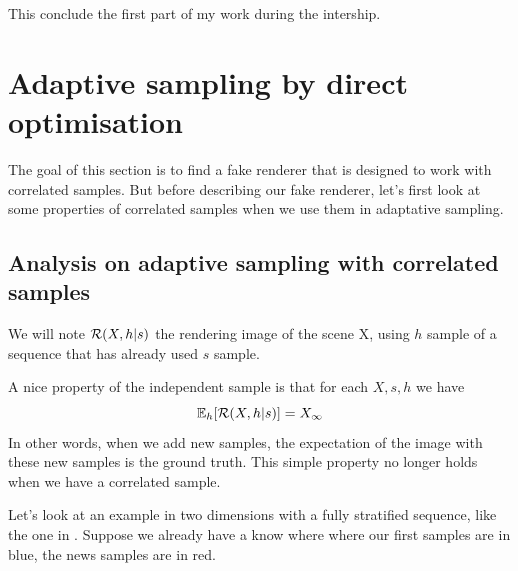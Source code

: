 \documentclass{classeENS}
\begin{document}
\par This conclude the first part of my work during the intership.


\section{Adaptive sampling by direct optimisation}

The goal of this section is to find a fake renderer that is designed to work
with correlated samples. But before describing our fake renderer, let's first look at
some properties of correlated samples when we use them in adaptative sampling.

\subsection{Analysis on adaptive sampling with correlated samples}

We will note $\mathcal R(X, h | s)$ the rendering image of the scene X, using $h$ sample of
a sequence that has already used $s$ sample.

\par A nice property of the independent sample is that for each $X,s,h$ we have
\[ \mathbb E_h[\mathcal R(X,h | s)] = X_\infty \]
In other words, when we add new samples, the expectation of the image 
with these new samples is the ground truth. This simple property no 
longer holds when we have a correlated sample.
\par Let's look at an example in two dimensions with a fully stratified 
sequence, like the one in \cite{10.2312:sr.20211287}. Suppose we already 
have a know where where our first samples are in blue, the news samples 
are in red.
\end{document}
